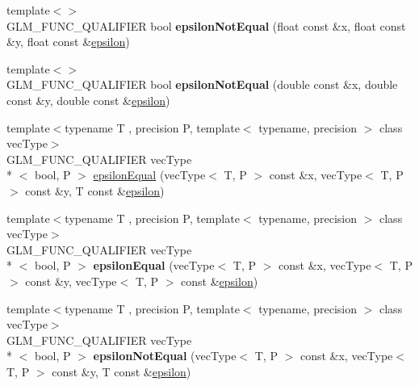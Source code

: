 \begin{DoxyCompactItemize}
\item 
\hypertarget{namespaceglm_af4127d65f4afc6e447d461bae25f90fe}{{\footnotesize template$<$$>$ }\\G\-L\-M\-\_\-\-F\-U\-N\-C\-\_\-\-Q\-U\-A\-L\-I\-F\-I\-E\-R bool {\bfseries epsilon\-Not\-Equal} (float const \&x, float const \&y, float const \&\hyperlink{group__gtc__constants_gacb41049b8d22c8aa90e362b96c524feb}{epsilon})}\label{namespaceglm_af4127d65f4afc6e447d461bae25f90fe}

\item 
\hypertarget{namespaceglm_a68d8ce38812c8599018e404afc79f088}{{\footnotesize template$<$$>$ }\\G\-L\-M\-\_\-\-F\-U\-N\-C\-\_\-\-Q\-U\-A\-L\-I\-F\-I\-E\-R bool {\bfseries epsilon\-Not\-Equal} (double const \&x, double const \&y, double const \&\hyperlink{group__gtc__constants_gacb41049b8d22c8aa90e362b96c524feb}{epsilon})}\label{namespaceglm_a68d8ce38812c8599018e404afc79f088}

\item 
{\footnotesize template$<$typename T , precision P, template$<$ typename, precision $>$ class vec\-Type$>$ }\\G\-L\-M\-\_\-\-F\-U\-N\-C\-\_\-\-Q\-U\-A\-L\-I\-F\-I\-E\-R vec\-Type\\*
$<$ bool, P $>$ \hyperlink{group__gtc__epsilon_gaca9443f217dc36587624247245522331}{epsilon\-Equal} (vec\-Type$<$ T, P $>$ const \&x, vec\-Type$<$ T, P $>$ const \&y, T const \&\hyperlink{group__gtc__constants_gacb41049b8d22c8aa90e362b96c524feb}{epsilon})
\item 
\hypertarget{namespaceglm_abc7f87cb473f9c9d7d6109e96c139807}{{\footnotesize template$<$typename T , precision P, template$<$ typename, precision $>$ class vec\-Type$>$ }\\G\-L\-M\-\_\-\-F\-U\-N\-C\-\_\-\-Q\-U\-A\-L\-I\-F\-I\-E\-R vec\-Type\\*
$<$ bool, P $>$ {\bfseries epsilon\-Equal} (vec\-Type$<$ T, P $>$ const \&x, vec\-Type$<$ T, P $>$ const \&y, vec\-Type$<$ T, P $>$ const \&\hyperlink{group__gtc__constants_gacb41049b8d22c8aa90e362b96c524feb}{epsilon})}\label{namespaceglm_abc7f87cb473f9c9d7d6109e96c139807}

\item 
\hypertarget{namespaceglm_a76da74051c42eebf3256cd31464fa043}{{\footnotesize template$<$typename T , precision P, template$<$ typename, precision $>$ class vec\-Type$>$ }\\G\-L\-M\-\_\-\-F\-U\-N\-C\-\_\-\-Q\-U\-A\-L\-I\-F\-I\-E\-R vec\-Type\\*
$<$ bool, P $>$ {\bfseries epsilon\-Not\-Equal} (vec\-Type$<$ T, P $>$ const \&x, vec\-Type$<$ T, P $>$ const \&y, T const \&\hyperlink{group__gtc__constants_gacb41049b8d22c8aa90e362b96c524feb}{epsilon})}\label{namespaceglm_a76da74051c42eebf3256cd31464fa043}


\end{DoxyCompactItemize}
